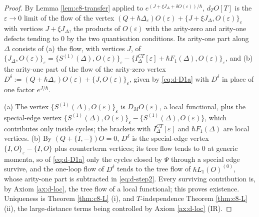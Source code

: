 \begin{proof}
By Lemma \ref{lem:c8-transfer} applied to $e^{(J+\xi J_\Delta+\delta O(\varepsilon))/\hbar}$, $d_TO[T]$ is the $\varepsilon\to0$ limit of the flow of the vertex $(Q+\hbar\Delta_\varepsilon)O(\varepsilon)+\{J+\xi J_\Delta,O(\varepsilon)\}_\varepsilon$ with vertices $J+\xi J_\Delta$, the products of $O(\varepsilon)$ with the arity-zero and arity-one defects tending to $0$ by the two quantisation conditions. Its arity-one part along $\Delta$ consists of (a) the flow, with vertices $J$, of $\{J_\Delta,O(\varepsilon)\}_\varepsilon=\{S^{(1)}(\Delta),O(\varepsilon)\}_\varepsilon-\{I^{CT}_\Delta[\varepsilon]+\hbar F_1(\Delta),O(\varepsilon)\}_\varepsilon$, and (b) the arity-one part of the flow of the arity-zero vertex $D^\delta:=(Q+\hbar\Delta_\varepsilon)O(\varepsilon)+\{J,O(\varepsilon)\}_\varepsilon$, given by \eqref{eq:d-D1a} with $D^\delta$ in place of one factor $e^{J/\hbar}$.

(a) The vertex $\{S^{(1)}(\Delta),O(\varepsilon)\}_\varepsilon$ is $D_MO(\varepsilon)$, a local functional, plus the special-edge vertex $\{S^{(1)}(\Delta),O(\varepsilon)\}_\varepsilon-\{S^{(1)}(\Delta),O(\varepsilon)\}$, which contributes only inside cycles; the brackets with $I^{CT}_\Delta[\varepsilon]$ and $\hbar F_1(\Delta)$ are local vertices. (b) By $(Q+\{I,-\})O=0$, $D^\delta$ is the special-edge vertex $\{I,O\}_\varepsilon-\{I,O\}$ plus counterterm vertices; its tree flow tends to $0$ at generic momenta, so of \eqref{eq:d-D1a} only the cycles closed by $\Psi$ through a special edge survive, and the one-loop flow of $D^\delta$ tends to the tree flow of $\hbar L_1(O)^{(0)}$, whose arity-one part is subtracted in \eqref{eq:d-step2}. Every surviving contribution is, by Axiom \ref{ax:d-loc}, the tree flow of a local functional; this proves existence. Uniqueness is Theorem \ref{thm:c8-L} (i), and $T$-independence Theorem \ref{thm:c8-L} (ii), the large-distance terms being controlled by Axiom \ref{ax:d-loc} (IR).


\end{proof}
